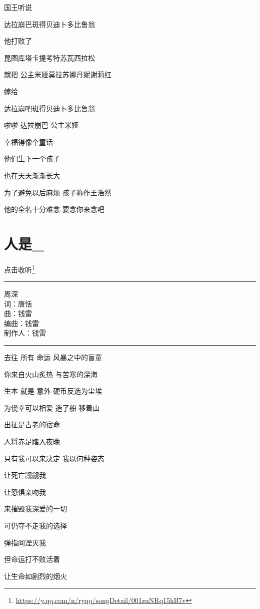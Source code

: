 \documentclass[]{ctexbook}
\renewcommand{\href}[2]{#2\footnote{\url{#1}}}
\begin{document}
国王听说

达拉崩巴斑得贝迪卜多比鲁翁

他打败了

昆图库塔卡提考特苏瓦西拉松

就把 公主米娅莫拉苏娜丹妮谢莉红

嫁给

达拉崩吧斑得贝迪卜多比鲁翁

啦啦 达拉崩巴 公主米娅

幸福得像个童话

他们生下一个孩子

也在天天渐渐长大

为了避免以后麻烦 孩子称作王浩然

他的全名十分难念 要念你来念吧

\section*{人是\_}\label{renshi}


\href{https://y.qq.com/n/ryqq/songDetail/001zuNRq15kB7v}{点击收听}

\begin{center}\rule{0.5\linewidth}{0.5pt}\end{center}

周深\\
词：唐恬\\
曲：钱雷\\
编曲：钱雷\\
制作人：钱雷

\begin{center}\rule{0.5\linewidth}{0.5pt}\end{center}

去往 所有 命运 风暴之中的盲童

你来自火山炙热 与苦寒的深海

生本 就是 意外 硬币反选为尘埃

为侥幸可以相爱 造了船 移着山

出征是古老的宿命

人将赤足踏入夜晚

只有我可以来决定 我以何种姿态

让死亡觊觎我

让恐惧亲吻我

来摧毁我深爱的一切

可仍夺不走我的选择

弹指间湮灭我

但命运打不败活着

让生命如剧烈的烟火
\end{document}
